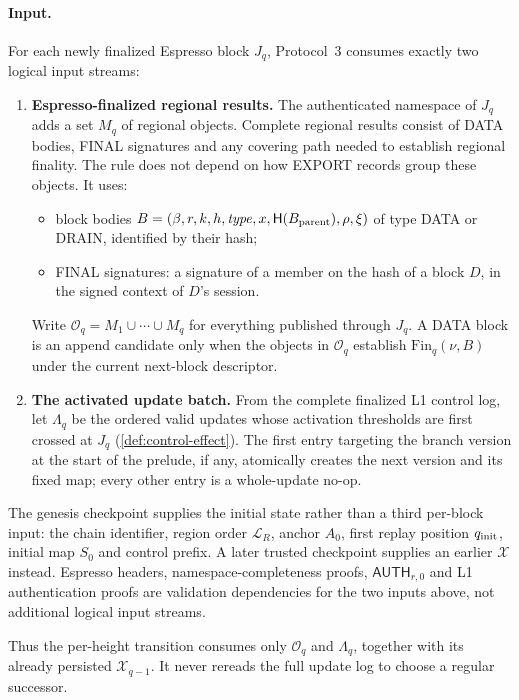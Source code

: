 \documentclass[11pt,a4paper]{article}
\newcommand{\Hash}{\mathsf H}
\newcommand{\tagg}[1]{\ensuremath{\mathsf{#1}}}
\begin{document}
\paragraph{Input.}
\label{sec:logical-carrier}
For each newly finalized Espresso block $J_q$, Protocol~3 consumes
exactly two logical input streams:
\begin{enumerate}[label=(I\arabic*),itemsep=2pt]
\item \textbf{Espresso-finalized regional results.}  The authenticated
namespace of $J_q$ adds a set $M_q$ of regional objects.  Complete
regional results consist of DATA bodies, FINAL signatures and any
covering path needed to establish regional finality.  The rule does not
depend on how EXPORT records group these objects.  It uses:
 \begin{itemize}[itemsep=1pt]
 \item block bodies
 $B=(\beta,r,k,h,\mathit{type},x,\Hash(B_{\rm parent}),\rho,\xi)$ of type
 DATA or DRAIN, identified by their hash;
 \item FINAL signatures: a signature of a member on the hash of a block
 $D$, in the signed context of $D$'s session.
 \end{itemize}
Write $\mathcal O_q=M_1\cup\cdots\cup M_q$ for everything published
through $J_q$. A DATA block is an append candidate only when the objects
in $\mathcal O_q$ establish $\mathrm{Fin}_q(\nu,B)$ under the current
next-block descriptor.
\item \textbf{The activated update batch.}  From the complete finalized
L1 control log, let $\Lambda_q$ be the ordered valid updates whose
activation thresholds are first crossed at $J_q$
(\cref{def:control-effect}).  The first entry targeting the branch
version at the start of the prelude, if any, atomically creates the next
version and its fixed map; every other entry is a whole-update no-op.
\end{enumerate}
The genesis checkpoint supplies the initial state rather than a third
per-block input: the chain identifier, region order $\mathcal L_R$,
anchor $A_0$, first replay position $q_{\rm init}$, initial map $S_0$
and control prefix. A later trusted checkpoint supplies an earlier
$\mathcal X$ instead. Espresso headers, namespace-completeness
proofs, $\tagg{AUTH}_{r,0}$ and L1 authentication proofs are validation
dependencies for the two inputs above, not additional logical input
streams.

Thus the per-height transition consumes only $\mathcal O_q$ and
$\Lambda_q$, together with its already persisted $\mathcal X_{q-1}$.
It never rereads the full update log to choose a regular successor.
\end{document}
